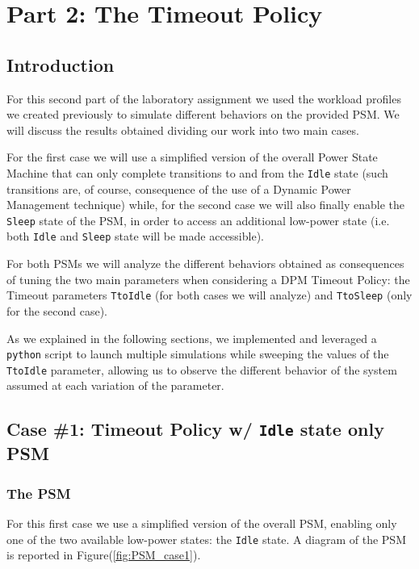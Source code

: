 \documentclass[a4paper]{article}
\begin{document}
\section{Part 2: The Timeout Policy}
    \subsection{Introduction}
        For this second part of the laboratory assignment we used the workload profiles we created previously to simulate different behaviors on the provided PSM. We will discuss the results obtained dividing our work into two main cases.

        For the first case we will use a simplified version of the overall Power State Machine that can only complete transitions to and from the \texttt{Idle} state (such transitions are, of course, consequence of the use of a Dynamic Power Management technique) while, for the second case we will also finally enable the \texttt{Sleep} state of the PSM, in order to access an additional low-power state (i.e. both \texttt{Idle} and \texttt{Sleep} state will be made accessible).

        For both PSMs we will analyze the different behaviors obtained as consequences of tuning the two main parameters when considering a DPM Timeout Policy: the Timeout parameters \texttt{TtoIdle} (for both cases we will analyze) and \texttt{TtoSleep} (only for the second case).

        As we explained in the following sections, we implemented and leveraged a \texttt{python} script to launch multiple simulations while sweeping the values of the \texttt{TtoIdle} parameter, allowing us to observe the different behavior of the system assumed at each variation of the parameter.

    \subsection{Case \#1: Timeout Policy w/ \texttt{Idle} state only PSM}
        \subsubsection{The PSM}
            For this first case we use a simplified version of the overall PSM, enabling only one of the two available low-power states: the \texttt{Idle} state. A diagram of the PSM is reported in Figure(\ref{fig:PSM_case1}).
\end{document}
